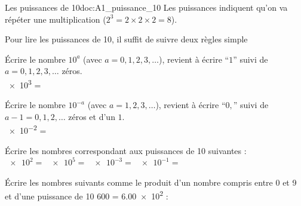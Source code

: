 \teteSndMeth

\vspace*{-36pt}


\vspace*{-20pt}
\vspace*{-8pt}

\begin{doc}{Les puissances de 10}{doc:A1_puissance_10}
  Les puissances indiquent qu'on va répéter une multiplication ($2^3 = 2 \times 2 \times 2 = 8$).
  
  Pour lire les puissances de 10, il suffit de suivre deux règles simple
  \begin{encart}
    \pointCyan Écrire le nombre $10^a$ (avec $a = 0, 1, 2, 3, \ldots$), revient à écrire ``$1$'' suivi de $a = 0, 1, 2, 3, \ldots$ zéros. \\
    \exemple \num{e3} = 

    \pointCyan Écrire le nombre $10^{-a}$ (avec $a = 1, 2, 3, \ldots$), revient à écrire ``$0,$'' suivi de $a - 1 = 0, 1, 2, \ldots$ zéros et d'un $1$. \\
    \exemple \num{e-2} = 
  \end{encart}
\end{doc}


\numeroQuestion Écrire les nombres correspondant aux puissances de 10 suivantes : \\
$\num{e2}  =$  \qq{}
$\num{e5}  =$  \qq{}
$\num{e-3} =$  \qq{}
$\num{e-1} =$ 

\numeroQuestion Écrire les nombres suivants comme le produit d'un nombre compris entre 0 et 9 et d'une puissance de 10 \exemple \num{600} = \num{6,00e2} : \\


